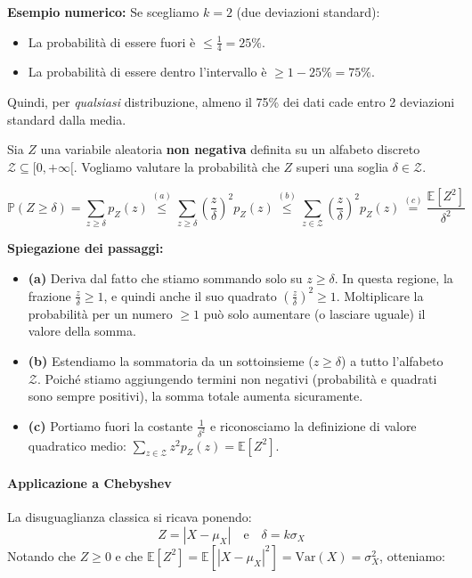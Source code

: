 \textbf{Esempio numerico:}
Se scegliamo $k=2$ (due deviazioni standard):
\begin{itemize}
    \item La probabilità di essere fuori è $\le \frac{1}{4} = 25\%$.
    \item La probabilità di essere dentro l'intervallo è $\ge 1 - 25\% = 75\%$.
\end{itemize}
Quindi, per \textit{qualsiasi} distribuzione, almeno il 75\% dei dati cade entro 2 deviazioni standard dalla media.

Sia $Z$ una variabile aleatoria \textbf{non negativa} definita su un alfabeto discreto $\mathcal{Z} \subseteq [0, +\infty[$. Vogliamo valutare la probabilità che $Z$ superi una soglia $\delta \in \mathcal{Z}$.

\begin{equation}
\mathbb{P}(Z \ge \delta) = \sum_{z \ge \delta} p_Z(z) 
\stackrel{(a)}{\le} \sum_{z \ge \delta} \left(\frac{z}{\delta}\right)^2 p_Z(z) 
\stackrel{(b)}{\le} \sum_{z \in \mathcal{Z}} \left(\frac{z}{\delta}\right)^2 p_Z(z) 
\stackrel{(c)}{=} \frac{\mathbb{E}[Z^2]}{\delta^2}
\end{equation}

\textbf{Spiegazione dei passaggi:}
\begin{itemize}
    \item \textbf{(a)} Deriva dal fatto che stiamo sommando solo su $z \ge \delta$. In questa regione, la frazione $\frac{z}{\delta} \ge 1$, e quindi anche il suo quadrato $\left(\frac{z}{\delta}\right)^2 \ge 1$. Moltiplicare la probabilità per un numero $\ge 1$ può solo aumentare (o lasciare uguale) il valore della somma.
    \item \textbf{(b)} Estendiamo la sommatoria da un sottoinsieme ($z \ge \delta$) a tutto l'alfabeto $\mathcal{Z}$. Poiché stiamo aggiungendo termini non negativi (probabilità e quadrati sono sempre positivi), la somma totale aumenta sicuramente.
    \item \textbf{(c)} Portiamo fuori la costante $\frac{1}{\delta^2}$ e riconosciamo la definizione di valore quadratico medio: $\sum_{z \in \mathcal{Z}} z^2 p_Z(z) = \mathbb{E}[Z^2]$.
\end{itemize}

\paragraph{Applicazione a Chebyshev}
La disuguaglianza classica si ricava ponendo:
\[ Z = |X - \mu_X| \quad \text{e} \quad \delta = k\sigma_X \]
Notando che $Z \ge 0$ e che $\mathbb{E}[Z^2] = \mathbb{E}[|X-\mu_X|^2] = \text{Var}(X) = \sigma_X^2$, otteniamo:

